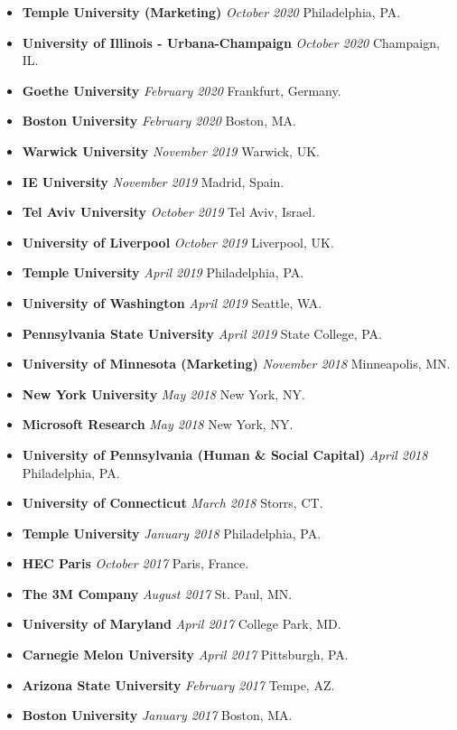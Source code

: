 \documentclass[10.5pt,letterpaper,sans]{moderncv}        %
\begin{document}
\begin{itemize}
\item \textbf{Temple University (Marketing)} \textit{October 2020} Philadelphia, PA.
\item \textbf{University of Illinois - Urbana-Champaign} \textit{October 2020} Champaign, IL.
\item \textbf{Goethe University} \textit{February 2020} Frankfurt, Germany.
\item \textbf{Boston University} \textit{February 2020} Boston, MA.
\item \textbf{Warwick University} \textit{November 2019} Warwick, UK.
\item \textbf{IE University} \textit{November 2019} Madrid, Spain.
\item \textbf{Tel Aviv University} \textit{October 2019} Tel Aviv, Israel.
\item \textbf{University of Liverpool} \textit{October 2019} Liverpool, UK.
\item \textbf{Temple University} \textit{April 2019} Philadelphia, PA.
\item \textbf{University of Washington} \textit{April 2019} Seattle, WA.
\item \textbf{Pennsylvania State University} \textit{April 2019} State College, PA.
\item \textbf{University of Minnesota (Marketing)} \textit{November 2018} Minneapolis, MN.
\item \textbf{New York University} \textit{May 2018} New York, NY.
\item \textbf{Microsoft Research} \textit{May 2018} New York, NY.
\item \textbf{University of Pennsylvania (Human \& Social Capital)} \textit{April 2018} Philadelphia, PA.
\item \textbf{University of Connecticut} \textit{March 2018} Storrs, CT.
\item \textbf{Temple University} \textit{January 2018} Philadelphia, PA.
\item \textbf{HEC Paris} \textit{October 2017} Paris, France.
\item \textbf{The 3M Company} \textit{August 2017} St. Paul, MN.
\item \textbf{University of Maryland} \textit{April 2017} College Park, MD.
\item \textbf{Carnegie Melon University} \textit{April 2017} Pittsburgh, PA.
\item \textbf{Arizona State University} \textit{February 2017} Tempe, AZ.
\item \textbf{Boston University} \textit{January 2017} Boston, MA.

\end{itemize}
\end{document}
